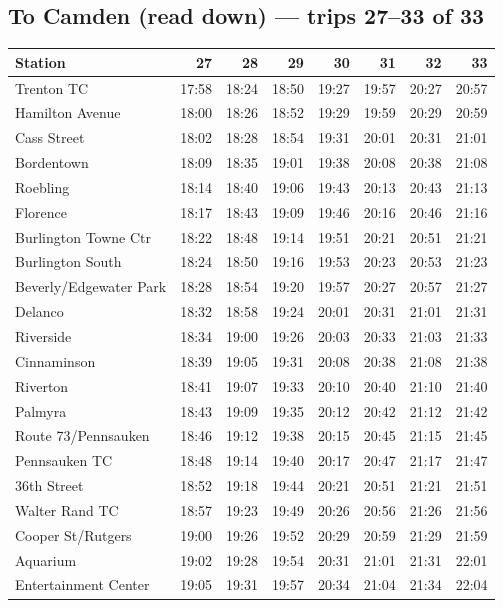 \subsection*{To Camden (read down) --- trips 27--33 of 33}
\begin{center}\footnotesize\setlength{\tabcolsep}{3pt}\begin{tabular}{@{}lrrrrrrr@{}}\toprule
Station & 27 & 28 & 29 & 30 & 31 & 32 & 33 \\\midrule
Trenton TC & 17:58 & 18:24 & 18:50 & 19:27 & 19:57 & 20:27 & 20:57 \\
Hamilton Avenue & 18:00 & 18:26 & 18:52 & 19:29 & 19:59 & 20:29 & 20:59 \\
Cass Street & 18:02 & 18:28 & 18:54 & 19:31 & 20:01 & 20:31 & 21:01 \\
Bordentown & 18:09 & 18:35 & 19:01 & 19:38 & 20:08 & 20:38 & 21:08 \\
Roebling & 18:14 & 18:40 & 19:06 & 19:43 & 20:13 & 20:43 & 21:13 \\
Florence & 18:17 & 18:43 & 19:09 & 19:46 & 20:16 & 20:46 & 21:16 \\
Burlington Towne Ctr & 18:22 & 18:48 & 19:14 & 19:51 & 20:21 & 20:51 & 21:21 \\
Burlington South & 18:24 & 18:50 & 19:16 & 19:53 & 20:23 & 20:53 & 21:23 \\
Beverly/Edgewater Park & 18:28 & 18:54 & 19:20 & 19:57 & 20:27 & 20:57 & 21:27 \\
Delanco & 18:32 & 18:58 & 19:24 & 20:01 & 20:31 & 21:01 & 21:31 \\
Riverside & 18:34 & 19:00 & 19:26 & 20:03 & 20:33 & 21:03 & 21:33 \\
Cinnaminson & 18:39 & 19:05 & 19:31 & 20:08 & 20:38 & 21:08 & 21:38 \\
Riverton & 18:41 & 19:07 & 19:33 & 20:10 & 20:40 & 21:10 & 21:40 \\
Palmyra & 18:43 & 19:09 & 19:35 & 20:12 & 20:42 & 21:12 & 21:42 \\
Route 73/Pennsauken & 18:46 & 19:12 & 19:38 & 20:15 & 20:45 & 21:15 & 21:45 \\
Pennsauken TC & 18:48 & 19:14 & 19:40 & 20:17 & 20:47 & 21:17 & 21:47 \\
36th Street & 18:52 & 19:18 & 19:44 & 20:21 & 20:51 & 21:21 & 21:51 \\
Walter Rand TC & 18:57 & 19:23 & 19:49 & 20:26 & 20:56 & 21:26 & 21:56 \\
Cooper St/Rutgers & 19:00 & 19:26 & 19:52 & 20:29 & 20:59 & 21:29 & 21:59 \\
Aquarium & 19:02 & 19:28 & 19:54 & 20:31 & 21:01 & 21:31 & 22:01 \\
Entertainment Center & 19:05 & 19:31 & 19:57 & 20:34 & 21:04 & 21:34 & 22:04 \\
\bottomrule\end{tabular}\end{center}
\clearpage
